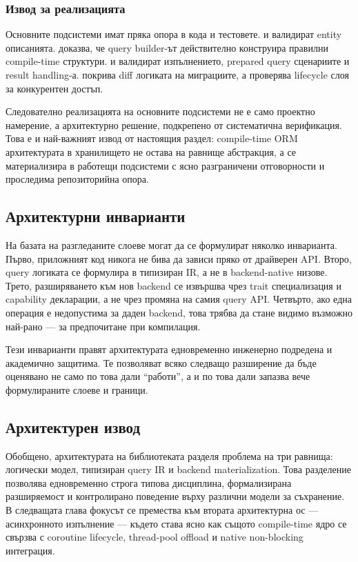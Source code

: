 \subsubsection{Извод за реализацията}

Основните подсистеми имат пряка опора в кода и тестовете.  и  валидират entity описанията.  доказва, че query builder-ът действително конструира правилни compile-time структури.  и  валидират изпълнението, prepared query сценариите и result handling-а.  покрива diff логиката на миграциите, а  проверява lifecycle слоя за конкурентен достъп.

Следователно реализацията на основните подсистеми не е само проектно намерение, а архитектурно решение, подкрепено от систематична верификация. Това е и най-важният извод от настоящия раздел: compile-time ORM архитектурата в хранилището не остава на равнище абстракция, а се материализира в работещи подсистеми с ясно разграничени отговорности и проследима репозиторийна опора.

\subsection{Архитектурни инварианти}

На базата на разгледаните слоеве могат да се формулират няколко инварианта. Първо, приложният код никога не бива да зависи пряко от драйверен API. Второ, query логиката се формулира в типизиран IR, а не в backend-native низове. Трето, разширяването към нов backend се извършва чрез trait специализация и capability декларации, а не чрез промяна на самия query API. Четвърто, ако една операция е недопустима за даден backend, това трябва да стане видимо възможно най-рано --- за предпочитане при компилация.

Тези инварианти правят архитектурата едновременно инженерно подредена и академично защитима. Те позволяват всяко следващо разширение да бъде оценявано не само по това дали ``работи'', а и по това дали запазва вече формулираните слоеве и граници.

\subsection{Архитектурен извод}

Обобщено, архитектурата на библиотеката разделя проблема на три равнища: логически модел, типизиран query IR и backend materialization. Това разделение позволява едновременно строга типова дисциплина, формализирана разширяемост и контролирано поведение върху различни модели за съхранение. В следващата глава фокусът се премества към втората архитектурна ос --- асинхронното изпълнение --- където става ясно как същото compile-time ядро се свързва с coroutine lifecycle, thread-pool offload и native non-blocking интеграция.
